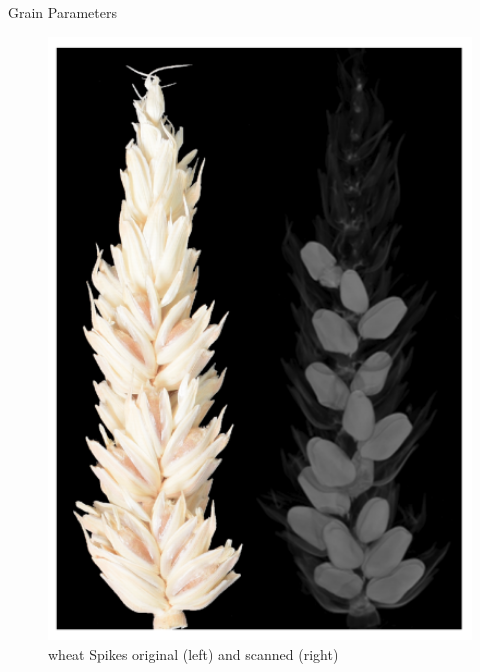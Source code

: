 \documentclass[final]{beamer}
\begin{document}
\begin{frame}{}
\begin{textblock}{27.7}
\begin{block}{Grain Parameters}
\begin{multicols}{2}
        \begin{figure}[htb]
          \centering
          \includegraphics[width=11.5cm]{collection.png}
          \caption{\label{fig:3d} wheat Spikes original (left) and scanned (right)}
        \end{figure}        
        
      \end{multicols}
      
    \end{block}


\end{textblock}
\end{frame}
\end{document}
